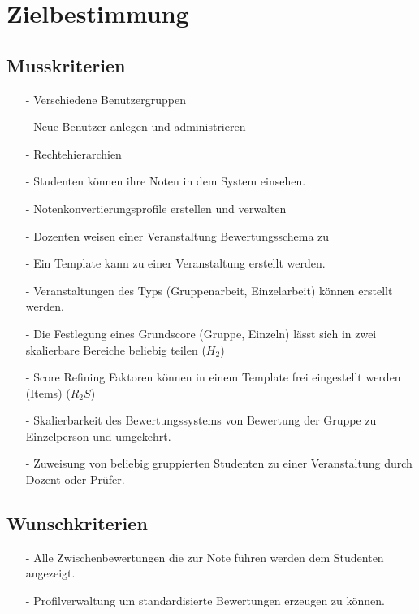 


	
	\tableofcontents
	\newpage

	\section{Zielbestimmung}
		\subsection{Musskriterien}			

			
			\begin{itemize}
			\item[-]	Verschiedene Benutzergruppen
			\item[-]	Neue Benutzer anlegen und administrieren 
			\item[-]	Rechtehierarchien
			\item[-]	Studenten können ihre Noten in dem System einsehen.
			\item[-]	Notenkonvertierungsprofile erstellen und verwalten
			\item[-]	Dozenten weisen einer Veranstaltung Bewertungsschema zu
			\item[-]	Ein Template kann zu einer Veranstaltung erstellt werden.
			\item[-]	Veranstaltungen des Typs (Gruppenarbeit, Einzelarbeit) können erstellt werden.
			\item[-]	Die Festlegung eines Grundscore (Gruppe, Einzeln) lässt sich in zwei skalierbare \newline Bereiche beliebig teilen ($H_2$)
			\item[-]	Score Refining Faktoren können in einem Template frei eingestellt werden (Items) ($R_2S$)
			\item[-]	Skalierbarkeit des Bewertungssystems von Bewertung der Gruppe zu Einzelperson und umgekehrt.
			\item[-]	Zuweisung von beliebig gruppierten Studenten zu einer Veranstaltung durch Dozent oder Prüfer.				
			\end{itemize}

			
		\subsection{Wunschkriterien}
		\begin{itemize}
		\item[-]	Alle Zwischenbewertungen die zur Note führen werden dem Studenten angezeigt.
		\item[-]	Profilverwaltung um standardisierte Bewertungen erzeugen zu können.
		\end{itemize}
		
